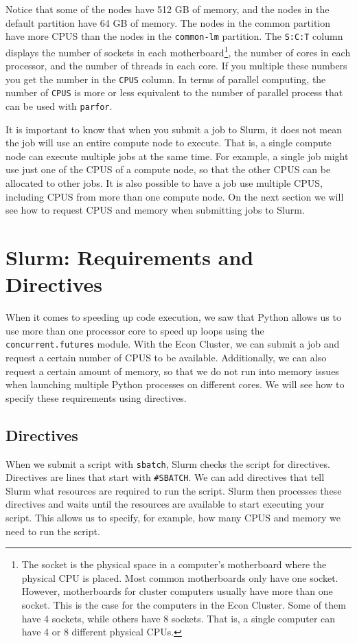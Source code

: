 \documentclass[12pt, a4paper]{article}
\begin{document}
Notice that some of the nodes have 512 GB of memory, and the nodes in the default partition have 64 GB of memory.
The nodes in the common partition have more CPUS than the nodes in the \texttt{common-lm} partition.
The \texttt{S:C:T} column displays the number of sockets in each motherboard\footnote{The socket is the physical space in a computer's motherboard where the physical CPU is placed. Most common motherboards only have one socket. However, motherboards for cluster computers usually have more than one socket. This is the case for the computers in the Econ Cluster. Some of them have 4 sockets, while others have 8 sockets. That is, a single computer can have 4 or 8 different physical CPUs.}, the number of cores in each processor, and the number of threads in each core.
If you multiple these numbers you get the number in the \texttt{CPUS} column.
In terms of parallel computing, the number of \texttt{CPUS} is more or less equivalent to the number of parallel process that can be used with \texttt{parfor}.

It is important to know that when you submit a job to Slurm, it does not mean the job will use an entire compute node to execute.
That is, a single compute node can execute multiple jobs at the same time.
For example, a single job might use just one of the CPUS of a compute node, so that the other CPUS can be allocated to other jobs.
It is also possible to have a job use multiple CPUS, including CPUS from more than one compute node.
On the next section we will see how to request CPUS and memory when submitting jobs to Slurm.
\section{Slurm: Requirements and Directives}
\label{sec:orgf3f23fa}
When it comes to speeding up code execution, we saw that Python allows us to use more than one processor core to speed up loops using the \texttt{concurrent.futures} module.
With the Econ Cluster, we can submit a job and request a certain number of CPUS to be available.
Additionally, we can also request a certain amount of memory, so that we do not run into memory issues when launching multiple Python processes on different cores.
We will see how to specify these requirements using directives.
\subsection{Directives}
\label{sec:org545e1c1}
When we submit a script with \texttt{sbatch}, Slurm checks the script for directives.
Directives are lines that start with \texttt{\#SBATCH}.
We can add directives that tell Slurm what resources are required to run the script.
Slurm then processes these directives and waits until the resources are available to start executing your script.
This allows us to specify, for example, how many CPUS and memory we need to run the script.
\end{document}
